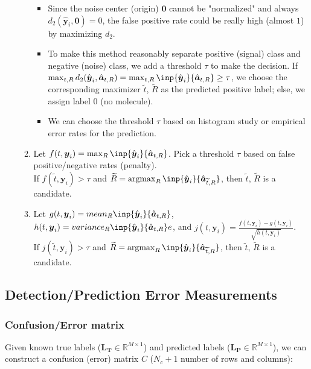 \documentclass[11pt]{article}
\newcommand{\by}{\boldsymbol{y}}
\newcommand{\ba}{\boldsymbol{a}}
\newcommand{\R}{\mathbb{R}}
\DeclareMathOperator*{\argmax}{argmax}
\begin{document}
\begin{itemize}
\begin{enumerate}
\begin{itemize}
            \item Since the noise center (origin) $\mathbf{0}$ cannot be "normalized" and always $d_{2}(\hat{\by}_i, \mathbf{0})=0$, the false positive rate could be really high (almost $1$) by maximizing $d_2$.
            \item To make this method reasonably separate positive (signal) class and negative (noise) class, we add a threshold $\tau$ to make the decision. If $\max_{t,R} d_{2}(\hat{\by}_i, \hat{\ba}_{t,R}) = \max_{t,R} \inp {\hat{\by}_i} {\hat{\ba}_{t,R}} \ge \tau$, we choose the corresponding maximizer $\widetilde{t}$, $\widetilde{R}$ as the predicted positive label; else, we assign label $0$ (no molecule).
            \item We can choose the threshold $\tau$ based on histogram study or empirical error rates for the prediction.
        \end{itemize}
        \item Let $f(t,\by_i) = \max_R \inp {\hat{\by}_i} {\hat{\ba}_{t,R}}$. Pick a threshold $\tau$ based on false positive/negative rates (penalty).\\
        If $f(\widetilde{t},\by_i) > \tau$ and $\widetilde{R} = \argmax_R \inp {\hat{\by}_i} {\hat{\ba}_{\widetilde{t},R}}$, then $\widetilde{t}$, $\widetilde{R}$ is a candidate.
        \item Let $g(t,\by_i) = {mean}_R \inp {\hat{\by}_i} {\hat{\ba}_{t,R}}$, $h(t,\by_i) = {variance}_R  \inp {\hat{\by}_i} {\hat{\ba}_{t,R}}e$, and $j(t,\by_i) = \frac{f(t,\by_i)-g(t,\by_i)}{\sqrt{h(t,\by_i)}}$. \\
        If $j(\widetilde{t},\by_i) > \tau$ and $\widetilde{R} = \argmax_R \inp {\hat{\by}_i} {\hat{\ba}_{\widetilde{t},R}}$, then $\widetilde{t}$, $\widetilde{R}$ is a candidate.
    \end{enumerate}
    
    \end{itemize}
    
    \subsection{Detection/Prediction Error Measurements}
    
    \subsubsection{Confusion/Error matrix}
    Given known true labels ($\mathbf{L_T} \in \R^{M\times 1}$) and predicted labels ($\mathbf{L_P} \in \R^{M\times 1}$), we can construct a confusion (error) matrix $C$ ($N_c+1$ number of rows and columns):
    \\\\
    
\end{document}
